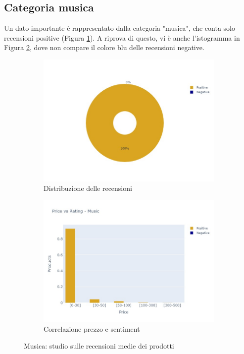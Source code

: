 		
		\subsection{Categoria musica}
			Un dato importante è rappresentato dalla categoria "musica", che conta solo recensioni positive (Figura \ref{fig:pie_music}). A riprova di questo, vi è anche l'istogramma in Figura \ref{fig:priceVSrating_music}, dove non compare il colore blu delle recensioni negative. 
				
			\begin{figure} [h]
				\centering
				\begin{subfigure}{0.48\textwidth}
					\includegraphics[width=\textwidth]{Figure/pie_music}
					\caption{Distribuzione delle recensioni}
					\label{fig:pie_music}
				\end{subfigure}
				\begin{subfigure}{0.48\textwidth}
					\includegraphics[width=\textwidth]{Figure/priceVSrating_music}
					\caption{Correlazione prezzo e sentiment}
					\label{fig:priceVSrating_music}
				\end{subfigure}
				\caption{Musica: studio sulle recensioni medie dei prodotti}\label{fig:price_raiting_music}
			\end{figure}
		

